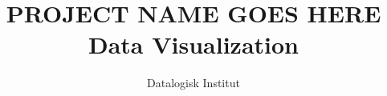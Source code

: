 

\title{
    \vspace{5cm}
    \Huge{\textsc{PROJECT NAME GOES HERE}}
    \linebreak
    \Large{Data Visualization}
}
\author{Datalogisk Institut}

\lstset{language=Python}





